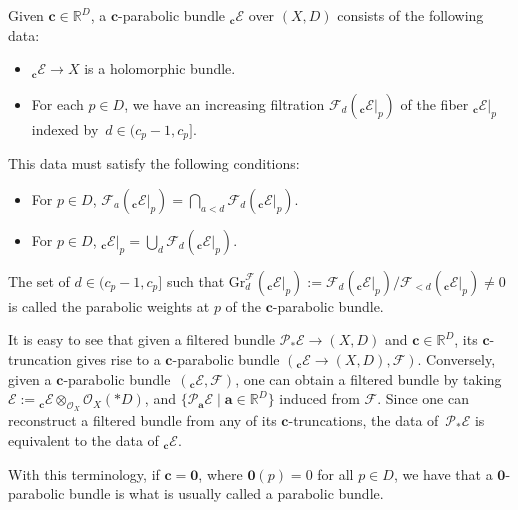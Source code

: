 \documentclass[11pt]{article}
\numberwithin{equation}{section}
\numberwithin{equation}{section}
\begin{document}
\begin{Definition} Given $\boldsymbol{c}\in \mathbb{R}^{D}$, a $\boldsymbol{c}$-parabolic bundle $_{\boldsymbol{c}}\mathcal{E}$ over $(X,D)$ consists of the following data:
\begin{itemize}\itemsep=0pt
 \item $_{\boldsymbol{c}}\mathcal{E} \to X$ is a holomorphic bundle.
 \item For each $p\in D$, we have an increasing filtration $\mathcal{F}_d(_{\boldsymbol{c}}\mathcal{E}|_p)$ of the fiber $_{\boldsymbol{c}}\mathcal{E}|_p$ indexed by~${d\in (c_p-1,c_p]}$.
\end{itemize}
This data must satisfy the following conditions:
\begin{itemize}\itemsep=0pt
 \item For $p\in D$, $\mathcal{F}_a(_{\boldsymbol{c}}\mathcal{E}|_p)=\bigcap_{a<d}\mathcal{F}_d(_{\boldsymbol{c}}\mathcal{E}|_p)$.
 \item For $p\in D$, $_{\boldsymbol{c}}\mathcal{E}|_p=\bigcup_{d}\mathcal{F}_d(_{\boldsymbol{c}}\mathcal{E}|_p)$.
\end{itemize}
The set of $d\in (c_p-1,c_p]$ such that $\text{Gr}^{\mathcal{F}}_{d}(_{\boldsymbol{c}}\mathcal{E}|_p):=\mathcal{F}_d(_{\boldsymbol{c}}\mathcal{E}|_p)/\mathcal{F}_{<d}(_{\boldsymbol{c}}\mathcal{E}|_p)\neq 0$ is called the parabolic weights at $p$ of the $\boldsymbol{c}$-parabolic bundle.
\end{Definition}
It is easy to see that given a filtered bundle $\mathcal{P}_*\mathcal{E}\to (X,D)$ and $\boldsymbol{c}\in \mathbb{R}^{D}$, its $\boldsymbol{c}$-truncation gives rise to a $\boldsymbol{c}$-parabolic bundle $(_{\boldsymbol{c}}\mathcal{E}\to (X,D),\mathcal{F})$. Conversely, given a $\boldsymbol{c}$-parabolic bundle~$(_{\boldsymbol{c}}\mathcal{E},\mathcal{F})$, one can obtain a filtered bundle by taking $\mathcal{E}:= {}_{\boldsymbol{c}}\mathcal{E}\otimes_{\mathcal{O}_X} \mathcal{O}_X(*D)$, and $\bigl\{\mathcal{P}_{\boldsymbol{a}}\mathcal{E} \mid \boldsymbol{a}\in \mathbb{R}^{D} \bigr\}$ induced from $\mathcal{F}$. Since one can reconstruct a filtered bundle from any of its $\boldsymbol{c}$-truncations, the data of~$\mathcal{P}_*\mathcal{E}$ is equivalent to the data of $_{\boldsymbol{c}}\mathcal{E}$.

With this terminology, if $\boldsymbol{c}=\boldsymbol{0}$, where $\boldsymbol{0}(p)=0$ for all $p\in D$, we have that a $\boldsymbol{0}$-parabolic bundle is what is usually called a parabolic bundle.
\end{document}
